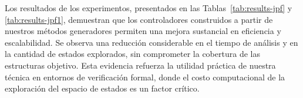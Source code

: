 Los resultados de los experimentos, presentados en las Tablas~\ref{tab:results-jpf} y \ref{tab:results-jpf1}, demuestran que los controladores construidos a partir de nuestros 
métodos generadores permiten una mejora sustancial en eficiencia y escalabilidad. Se observa una reducción considerable en el tiempo de análisis y en la cantidad de estados explorados, sin 
comprometer la cobertura de las estructuras objetivo. Esta evidencia refuerza la utilidad práctica 
de nuestra técnica en entornos de verificación formal, donde el costo computacional de la exploración 
del espacio de estados es un factor crítico.




